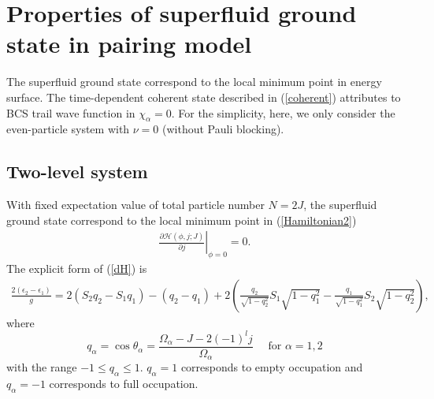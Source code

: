 \documentclass[11pt]{book} %
\begin{document}
\clearpage{\pagestyle{empty}\cleardoublepage}
\chapter{Properties of superfluid ground state in pairing model}
The superfluid ground state correspond to the local minimum point in energy surface. The time-dependent coherent state described in (\ref{coherent}) attributes to BCS trail wave function in $\chi_{\alpha}=0$. For the simplicity, here, we only consider the even-particle system with $\nu=0$ (without Pauli blocking).

\section{Two-level system}
\label{two-level}
With fixed expectation value of total particle number $N=2J$, the superfluid ground state correspond to the local minimum point in (\ref{Hamiltonian2})
\begin{align}
	\left. \frac{\partial\mathcal{H}(\phi,j;J)}{\partial j} \right|_{\phi=0}=0 .
	\label{dH}
\end{align}
The explicit form of (\ref{dH}) is
\begin{align}
	\frac{2(\epsilon_2-\epsilon_1)}{g} =
	2(S_2q_2-S_1q_1)-(q_2-q_1) + 2\left(\frac{q_2}{\sqrt{1-q_2^2}}S_1\sqrt{1-q_1^2}
	-\frac{q_1}{\sqrt{1-q_1^2}}S_2\sqrt{1-q_2^2}\right) ,
	\label{BCS_2level}
\end{align}
where 
\begin{equation}
	q_{\alpha}=\cos{\theta_{\alpha}} = \frac{\Omega_{\alpha} - J -2(-1)^l j}{\Omega_{\alpha}} 
	\quad \mbox{ for } \alpha=1,2
	\label{q_l}
\end{equation}
with the range $-1\le q_{\alpha}\le 1$. $q_{\alpha}=1$ corresponds to empty occupation and $q_{\alpha}=-1$ corresponds to full occupation. 
\end{document}
